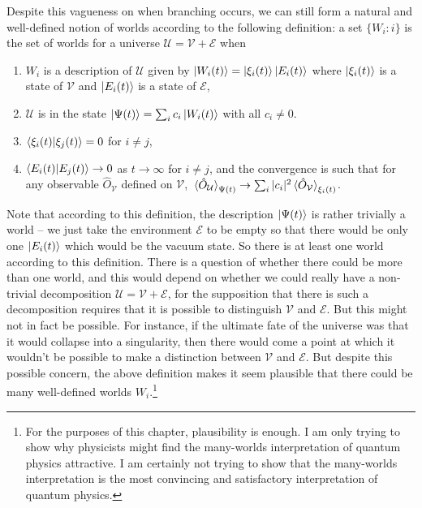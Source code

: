     Despite this vagueness on when branching occurs, we can still form a natural and well-defined notion of worlds according to the following definition: \label{rigorousworld} a set $\{W_i: i\}$ is the set of worlds for a universe $\mathcal{U}=\mathcal{V}+\mathcal{E}$ when 
     \begin{enumerate}[noitemsep, nosep, topsep=0pt]
     \item $W_i$ is a description of $\mathcal{U}$ given by $\ket{W_i(t)}=\ket{\xi_i(t)}\ket{E_i(t)}$ where $\ket{\xi_i(t)}$ is a state of $\mathcal{V}$ and $\ket{E_i(t)}$ is a state of $\mathcal{E}$,
     \item $\mathcal{U}$ is in the state $\ket{\Psi(t)}=\sum_i c_i \ket{W_i(t)}$ with all $c_i\neq 0$.
     \item $\ip{\xi_i(t)}{\xi_j(t)}=0$ for $i\neq j$,
     \item $\ip{E_i(t)}{E_j(t)}\rightarrow 0$ as $t\rightarrow\infty$ for $i\neq j$, and the convergence is such that for any observable $\hat{O}_\mathcal{V}$ defined on $\mathcal{V}$, $\ev*{\hat{O}_\mathcal{U}}_{\Psi(t)}\rightarrow\sum_i |c_i|^2 \ev*{\hat{O}_\mathcal{V}}_{\xi_i(t)}$. 
     \end{enumerate}
    Note that according to this definition, the description $\ket{\Psi(t)}$ is rather trivially a world -- we just take the environment $\mathcal{E}$ to be empty so that there would be only one $\ket{E_i(t)}$ which would be the vacuum state. So there is at least one world according to this definition. There is a question of whether there could be more than one world, and this would depend on whether we could really have a non-trivial decomposition $\mathcal{U}=\mathcal{V}+\mathcal{E}$, 
    for the supposition that there is such a decomposition requires that it is possible to distinguish $\mathcal{V}$ and $\mathcal{E}$. But this might not in fact be possible. For instance, if the ultimate fate of the universe was that it would collapse into a singularity, then there would come a point at which it wouldn't be possible to make a distinction between $\mathcal{V}$ and $\mathcal{E}$. But despite this possible concern, the above definition makes it seem plausible that there could be many well-defined worlds $W_i$.\footnote{For the purposes of this chapter, plausibility is enough. I am only trying to show why physicists might find the many-worlds interpretation of quantum physics attractive. I am certainly not trying to show that the many-worlds interpretation is the most convincing and satisfactory interpretation of quantum physics. }
    
